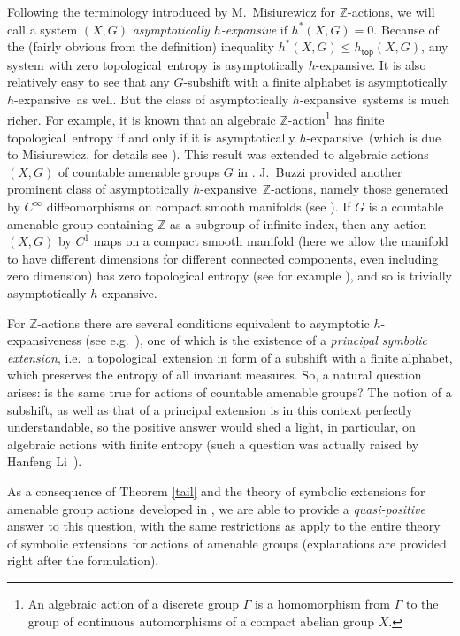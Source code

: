 \documentclass[12pt]{amsart}
\theoremstyle{definition}
\numberwithin{equation}{section}
\def \Z {\mathbb Z}
\def \htop {h_{\mathsf{top}}}
\def \tl {topological}
\def \im {invariant measure}
\def \htop{h_{\mathsf{top}}}
\def \ahe {asympto\-ti\-cally $h$-ex\-pan\-sive}
\def \Z {\mathbb Z}
\def \htop {h_{\mathsf{top}}}
\def \tl {topological}
\def \im {invariant measure}
\def \htop{h_{\mathsf{top}}}
\begin{document}
\medskip
Following the terminology introduced by M.\ Misiurewicz for $\Z$-actions, we will call a system $(X,G)$ \emph{\ahe} if $h^*(X,G)=0$. Because of the (fairly obvious from the definition) inequality $h^*(X,G)\le\htop(X,G)$, any system with zero \tl\ entropy is \ahe. It is also relatively easy to see that any $G$-subshift with a finite alphabet is \ahe\ as well. But the class of \ahe\ systems is much richer. For example, it is known that an algebraic $\mathbb{Z}$-action\footnote{An algebraic action of a discrete group $\Gamma$ is a homomorphism from $\Gamma$ to the group of continuous automorphisms of a compact abelian group $X$.} has finite \tl\ entropy if and only if it is \ahe\ (which is due to Misiurewicz, for details see \cite[Section 7]{Mi1}). This result was extended to algebraic actions $(X,G)$ of countable amenable groups $G$ in \cite[Theorem 7.1]{ChungZhang}. J.~Buzzi provided another prominent class of \ahe\ $\Z$-actions, namely those generated by $C^\infty$ diffeomorphisms on compact smooth manifolds (see \cite{Bu}). If $G$ is a countable amenable group containing $\mathbb{Z}$ as a subgroup of infinite index, then any action $(X,G)$ by $C^1$ maps on a compact smooth manifold (here we allow the manifold to have different dimensions for different connected components, even including zero dimension) has zero topological entropy (see for example \cite[Lemma~5.7]{LT}), and so is trivially \ahe. 

\medskip

For $\Z$-actions there are several conditions equivalent to asymptotic $h$-expansiveness (see e.g.\ \cite{D2005}), one of which is the existence of a \emph{principal symbolic extension}, i.e.\ a \tl\ extension in form of a subshift with a finite alphabet, which preserves the entropy of all \im s. So, a natural question arises: is the same true for actions of countable amenable groups? The notion of a subshift, as well as that of a principal extension is in this context perfectly understandable, so the positive answer would shed a light, in particular, on algebraic actions with finite entropy (such a question was actually raised by Hanfeng Li~\cite{Li}).

As a consequence of Theorem \ref{tail} and the theory of symbolic extensions for amenable group actions developed in \cite{DownarowiczZhang}, we are able to provide a \emph{quasi-positive} answer to this question, with the same restrictions as apply to the entire theory of symbolic extensions for actions of amenable groups (explanations are provided right after the formulation). 
\end{document}
